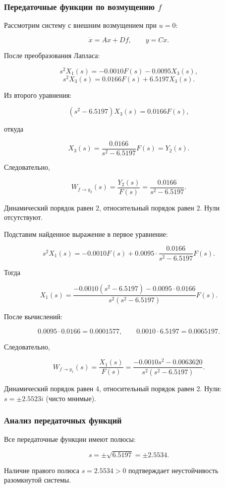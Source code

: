 \documentclass[a4paper,12pt]{article}
\begin{document}
\subsubsection{Передаточные функции по возмущению $f$}

Рассмотрим систему с внешним возмущением при $u = 0$:

\[
\dot{x} = Ax + Df, \qquad y = Cx.
\]

После преобразования Лапласа:

\[
s^2 X_1(s) = -0.0010 F(s) - 0.0095 X_3(s),
\]
\[
s^2 X_3(s) = 0.0166 F(s) + 6.5197 X_3(s).
\]

Из второго уравнения:

\[
(s^2 - 6.5197)X_3(s) = 0.0166 F(s),
\]

откуда

\[
X_3(s) = \frac{0.0166}{s^2 - 6.5197} F(s) = Y_2(s).
\]

Следовательно,

\[
W_{f \to y_2}(s) = \frac{Y_2(s)}{F(s)} = \frac{0.0166}{s^2 - 6.5197}.
\]

Динамический порядок равен 2, относительный порядок равен 2. Нули отсутствуют.

Подставим найденное выражение в первое уравнение:

\[
s^2 X_1(s) = -0.0010 F(s) + 0.0095 \cdot \frac{0.0166}{s^2 - 6.5197} F(s).
\]

Тогда

\[
X_1(s) = \frac{-0.0010(s^2 - 6.5197) - 0.0095 \cdot 0.0166}{s^2(s^2 - 6.5197)} F(s).
\]

После вычислений:

\[
0.0095 \cdot 0.0166 = 0.0001577, \qquad 0.0010 \cdot 6.5197 = 0.0065197.
\]

Следовательно,

\[
W_{f \to y_1}(s) = \frac{X_1(s)}{F(s)} = \frac{-0.0010s^2 - 0.0063620}{s^2(s^2 - 6.5197)}.
\]

Динамический порядок равен 4, относительный порядок равен 2. Нули: $s = \pm 2.5523i$ (чисто мнимые).

\subsubsection{Анализ передаточных функций}

Все передаточные функции имеют полюсы:

\[
s = \pm \sqrt{6.5197} = \pm 2.5534.
\]

Наличие правого полюса $s = 2.5534 > 0$ подтверждает неустойчивость разомкнутой системы.
\end{document}
